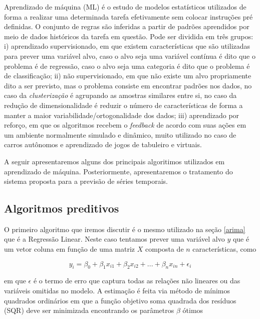 \documentclass[twocolumn]{rbef}
\newcommand{\1}{\mathbbm{1}}
\begin{document}
Aprendizado de máquina (ML) é o estudo de modelos estatísticos utilizados de forma a realizar uma determinada tarefa efetivamente sem colocar instruções pré definidas\cite{Samuel}. O conjunto de regras são inferidas a partir de padrões aprendidos por meio de dados históricos da tarefa em questão. Pode ser dividida em três grupos: i) aprendizado supervisionado, em que existem características que são utilizadas para prever uma variável alvo, caso o alvo seja uma variável contínua é dito que o problema é de regressão, caso o alvo seja uma categoria é dito que o problema é de classificação; ii) não supervisionado, em que não existe um alvo propriamente dito a ser previsto, mas o problema consiste em encontrar padrões nos dados, no caso da \textit{clusterização} é agrupando as amostras similares entre si, no caso da redução de dimensionalidade é reduzir o número de características de forma a manter a maior variabilidade/ortogonalidade dos dados; iii) aprendizado por reforço, em que os algoritmos recebem o \textit{feedback} de acordo com suas ações em um ambiente normalmente simulado e dinâmico, muito utilizado no caso de carros autônomos e aprendizado de jogos de tabuleiro e virtuais.

A seguir apresentaremos alguns dos principais algoritimos utilizados em aprendizado de máquina. Posteriormente, apresentaremos o tratamento do sistema proposta para a previsão de séries temporais.

\subsection{Algoritmos preditivos} \label{algos}

O primeiro algoritmo que iremos discutir é o mesmo utilizado na seção \ref{arima} que é a Regressão Linear. Neste caso tentamos prever uma variável alvo $y$ que é um vetor coluna em função de uma matriz $X$ composta de $n$ características\cite{Greene}, como

\begin{equation}
    y_{i} = \beta_{0} + \beta_{1} x_{i1} + \beta_{2} x_{i2} + ... + \beta_{n} x_{in} + \epsilon_{i}
\end{equation}

em que $\epsilon$ é o termo de erro que captura todas as relações não lineares ou das variáveis omitidas no modelo. A estimação é feita via método de mínimos quadrados ordinários em que a função objetivo soma quadrada dos resíduos (SQR) deve ser minimizada encontrando os parâmetros $\beta$ ótimos
\end{document}
